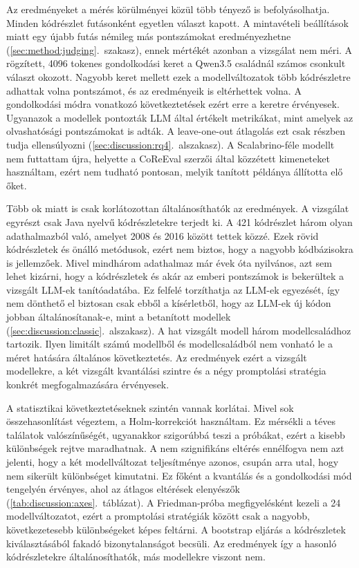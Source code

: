 \documentclass[
]{elteikthesis}[2024/04/26]
\begin{document}
Az eredményeket a mérés körülményei közül több tényező is befolyásolhatja.
Minden kódrészlet futásonként egyetlen választ kapott.
A mintavételi beállítások miatt egy újabb futás némileg más pontszámokat eredményezhetne (\ref{sec:method:judging}.~szakasz),
ennek mértékét azonban a vizsgálat nem méri.
A rögzített, 4096 tokenes gondolkodási keret a Qwen3.5 családnál számos csonkult választ okozott.
Nagyobb keret mellett ezek a modellváltozatok több kódrészletre adhattak volna pontszámot,
és az eredményeik is eltérhettek volna.
A gondolkodási módra vonatkozó következtetések ezért erre a keretre érvényesek.
Ugyanazok a modellek pontozták LLM által értékelt metrikákat,
mint amelyek az olvashatósági pontszámokat is adták.
A leave-one-out átlagolás ezt csak részben tudja ellensúlyozni (\ref{sec:discussion:rq4}.~alszakasz).
A Scalabrino-féle modellt nem futtattam újra, helyette a CoReEval szerzői által közzétett kimeneteket használtam,
ezért nem tudható pontosan, melyik tanított példánya állította elő őket.

Több ok miatt is csak korlátozottan általánosíthatók az eredmények.
A vizsgálat egyrészt csak Java nyelvű kódrészletekre terjedt ki.
A 421 kódrészlet három olyan adathalmazból való, amelyet 2008 és 2016 között tettek közzé.
Ezek rövid kódrészletek és önálló metódusok, ezért nem biztos, hogy a nagyobb kódbázisokra is jellemzőek.
Mivel mindhárom adathalmaz már évek óta nyilvános, azt sem lehet kizárni,
hogy a kódrészletek és akár az emberi pontszámok is bekerültek a vizsgált LLM-ek tanítóadatába.
Ez felfelé torzíthatja az LLM-ek egyezését, így nem dönthető el biztosan csak ebből a kísérletből,
hogy az LLM-ek új kódon jobban általánosítanak-e, mint a betanított modellek (\ref{sec:discussion:classic}.~alszakasz).
A hat vizsgált modell három modellcsaládhoz tartozik.
Ilyen limitált számú modellből és modellcsaládból nem vonható le a méret hatására általános következtetés.
Az eredmények ezért a vizsgált modellekre, a két vizsgált kvantálási szintre és
a négy promptolási stratégia konkrét megfogalmazására érvényesek.

A statisztikai következtetéseknek szintén vannak korlátai.
Mivel sok összehasonlítást végeztem, a Holm-korrekciót használtam.
Ez mérsékli a téves találatok valószínűségét, ugyanakkor szigorúbbá teszi a próbákat,
ezért a kisebb különbségek rejtve maradhatnak.
A nem szignifikáns eltérés ennélfogva nem azt jelenti,
hogy a két modellváltozat teljesítménye azonos,
csupán arra utal, hogy nem sikerült különbséget kimutatni.
Ez főként a kvantálás és a gondolkodási mód tengelyén érvényes,
ahol az átlagos eltérések elenyészők (\ref{tab:discussion:axes}.~táblázat).
A Friedman-próba megfigyelésként kezeli a 24 modellváltozatot,
ezért a promptolási stratégiák között csak a nagyobb,
következetesebb különbségeket képes feltárni.
A bootstrap eljárás a kódrészletek kiválasztásából fakadó bizonytalanságot becsüli.
Az eredmények így a hasonló kódrészletekre általánosíthatók, más modellekre viszont nem.
\end{document}
